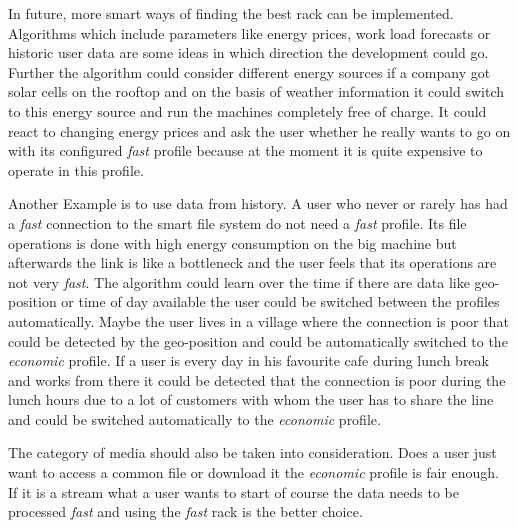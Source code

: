 \label{sec:outlook}
In future, more smart ways of finding the best rack can be implemented. Algorithms which include parameters like energy prices, work load forecasts or historic user data are some ideas in which direction the development could go. Further the algorithm could consider different energy sources if a company got solar cells on the rooftop and on the basis of weather information it could switch to this energy source and run the machines completely free of charge. It could react to changing energy prices and ask the user whether he really wants to go on with its configured \textit{fast} profile because at the moment it is quite expensive to operate in this profile.

Another Example is to use data from history. A user who never or rarely has had a \textit{fast} connection to the smart file system do not need a \textit{fast} profile. Its file operations is done with high energy consumption on the big machine but afterwards the link is like a bottleneck and the user feels that its operations are not very \textit{fast}. The algorithm could learn over the time if there are data like geo-position or time of day available the user could be switched between the profiles automatically. Maybe the user lives in a village where the connection is poor that could be detected by the geo-position and could be automatically switched to the \textit{economic} profile. If a user is every day in his favourite cafe during lunch break and works from there it could be detected that the connection is poor during the lunch hours due to a lot of customers with whom the user has to share the line and could be switched automatically to the \textit{economic} profile.

The category of media should also be taken into consideration. Does a user just want to access a common file or download it the \textit{economic} profile is fair enough. If it is a stream what a user wants to start of course the data needs to be processed \textit{fast} and using the \textit{fast} rack is the better choice.
